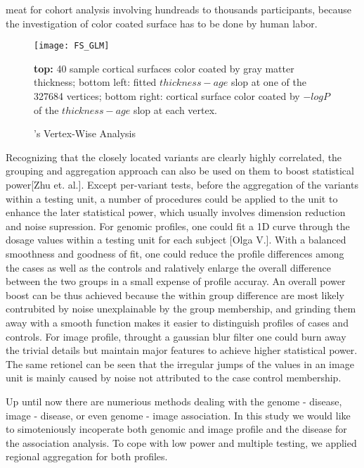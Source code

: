 meat for cohort analysis involving hundreads to thousands participants, because the investigation of color coated surface has to be done by human labor. 
\begin{figure}[h]
\texttt{[image: FS\_GLM]}
\caption[\FS's Vertex-Wise Analysis]{\FS's Vertex-Wise Analysis}
\label{fig:FS1}
\textbf{top:} 40 sample cortical surfaces color coated by gray matter thickness;
\textsf{bottom left:} fitted $thickness - age$ slop at one of the 327684 vertices;
\textsf{bottom right:} cortical surface color coated by $-log{P}$ of the $thickness - age$ slop at each vertex.
\end{figure}

Recognizing that the closely located variants are clearly highly correlated, the grouping and aggregation approach can also be used on them to boost statistical power[Zhu et. al.].
Except per-variant tests, before the aggregation of the variants within a testing unit, a number of procedures could be applied to the unit to enhance the later statistical power, which usually involves dimension reduction and noise supression. For genomic profiles, one could fit a 1D curve through the dosage values within a testing unit for each subject [Olga V.]. With a balanced smoothness and goodness of fit, one could reduce the profile differences among the cases as well as the controls and ralatively enlarge the overall difference between the two groups in a small expense of profile accuray. An overall power boost can be thus achieved because the within group difference are most likely contrubited by noise unexplainable by the group membership, and grinding them away with a smooth function makes it easier to distinguish profiles of cases and controls. For image profile, throught a gaussian blur filter one could burn away the trivial details but maintain major features to achieve higher statistical power. The same retionel can be seen that the irregular jumps of the values in an image unit is mainly caused by noise not attributed to the case control membership. 

Up until now there are numerious methods dealing with the genome - disease, image - disease, or even genome - image association. In this study we would like to simoteniously incoperate both genomic and image profile and the disease for the association analysis. To cope with low power and multiple testing, we applied regional aggregation for both profiles.
